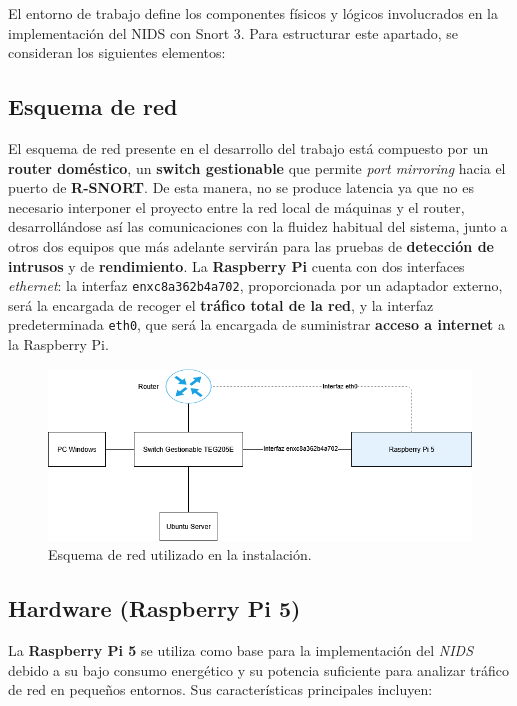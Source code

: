 \documentclass[12pt,a4paper]{report}
\begin{document}
El entorno de trabajo define los componentes físicos y lógicos involucrados en la implementación del NIDS con Snort 3. Para estructurar este apartado, se consideran los siguientes elementos:

\subsection{Esquema de red}

El esquema de red presente en el desarrollo del trabajo está compuesto por un \textbf{router doméstico}, un \textbf{switch gestionable} que permite \textit{port mirroring} hacia el puerto de \textbf{R-SNORT}. De esta manera, no se produce latencia ya que no es necesario interponer el proyecto entre la red local de máquinas y el router, desarrollándose así las comunicaciones con la fluidez habitual del sistema, junto a otros dos equipos que más adelante servirán para las pruebas de \textbf{detección de intrusos} y de \textbf{rendimiento}. La \textbf{Raspberry Pi} cuenta con dos interfaces \textit{ethernet}: la interfaz \texttt{enxc8a362b4a702}, proporcionada por un adaptador externo, será la encargada de recoger el \textbf{tráfico total de la red}, y la interfaz predeterminada \texttt{eth0}, que será la encargada de suministrar \textbf{acceso a internet} a la Raspberry Pi.

\begin{figure}[H]
	\centering
	\includegraphics[scale=0.4]{script_automatico/network.png}
	\caption{Esquema de red utilizado en la instalación.}
\end{figure}

\subsection{Hardware (Raspberry Pi 5)}

La \textbf{Raspberry Pi 5} se utiliza como base para la implementación del \textit{NIDS} debido a su bajo consumo energético y su potencia suficiente para analizar tráfico de red en pequeños entornos. Sus características principales incluyen:
\end{document}
